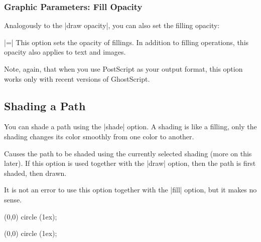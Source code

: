 


\subsubsection{Graphic Parameters: Fill Opacity}

\label{section-fill-opacity}
Analogously to the |draw opacity|, you can also set the filling
opacity:

\begin{itemize}
  |=|
  This option sets the opacity of fillings. In addition to filling
  operations, this opacity also applies to text and images.

  Note, again, that when you use PostScript as your output format,
  this option works only with recent versions of GhostScript.
  
\begin{codeexample}[]
\end{codeexample}

\begin{codeexample}[]
\end{codeexample}
\end{itemize}


\subsection{Shading a Path}

You can shade a path using the |shade| option. A shading is like a
filling, only the shading changes its color smoothly from one color to
another.

\begin{itemize}
  Causes the path to be shaded using the currently selected shading
  (more on this later). If this option is used together with the
  |draw| option, then the path is first shaded, then drawn.

  It is not an error to use this option together with the |fill|
  option, but it makes no sense.

\begin{codeexample}[]
\tikz \shade (0,0) circle (1ex);
\end{codeexample}

\begin{codeexample}[]
\tikz \shadedraw (0,0) circle (1ex);
\end{codeexample}
\end{itemize}

